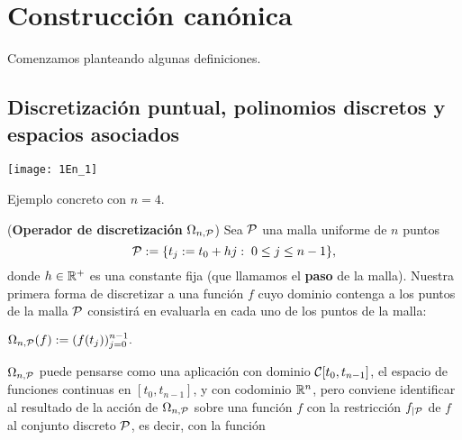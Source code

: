 \section{Construcción canónica}

Comenzamos planteando algunas definiciones.

\subsection{Discretización puntual, polinomios discretos y espacios asociados}
\label{discretizacion puntual, polinomios discretos y espacios asociados}

\begin{marginfigure}
\texttt{[image: 1En\_1]} 
		\caption{Ejemplo concreto con $n=4$.}
\end{marginfigure}


\begin{defi}
\label{def: operador de discretizacion puntual}
(\textbf{Operador de discretización} $\Omega_{n,\mathcal{P}}$)
Sea $\mathcal{P}$ una malla uniforme 
de $n$ puntos
\[
\mathcal{P}:=\{ t_{j}:=t_{0}+hj : \hspace{0.1cm} 0 \leq j \leq n-1 \},
\]
donde $h \in \mathbb{R}^{+}$ es una constante fija
(que llamamos el \textbf{paso} de la malla).
Nuestra primera forma de discretizar
a una función $f$ cuyo dominio contenga a los puntos
de la malla $\mathcal{P}$
consistirá en evaluarla en cada uno de los
puntos de la malla:

\begin{center}
$\Omega_{n,\mathcal{P}}(f) := (f(t_{j}))_{j=0}^{n-1}.$
\end{center}
\end{defi}



\noindent $\Omega_{n,\mathcal{P}}$
puede pensarse como una aplicación con dominio
$\mathcal{C}[t_{0}, t_{n-1}]$,
el espacio de funciones 
continuas en $[t_{0}, t_{n-1}]$,
y con codominio $\mathbb{R}^{n}$, pero conviene 
identificar al resultado 
de la acción de $\Omega_{n,\mathcal{P}}$ sobre una
función $f$ con la restricción $f_{| \mathcal{P}}$
de 
$f$ al conjunto discreto $\mathcal{P}$,
es decir, con la función


